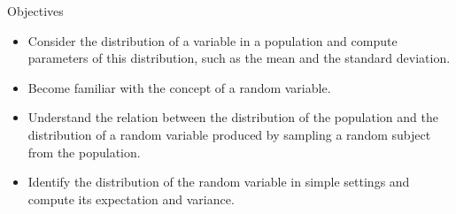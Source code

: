 \documentclass[10pt,handout]{beamer}\usepackage[]{graphicx}\usepackage[]{color}
\begin{document}
\begin{frame}{Objectives}
	
	\begin{itemize}[<+->]
		
		\item    Consider the distribution of a variable in a population and compute
		parameters of this distribution, such as the mean and the standard
		deviation.
		
		\item   Become familiar with the concept of a random variable.
		
		\item    Understand the relation between the distribution of the population
		and the distribution of a random variable produced by sampling a
		random subject from the population.
		
		\item    Identify the distribution of the random variable in simple settings
		and compute its expectation and variance.
	\end{itemize}
	
\end{frame}
\end{document}
